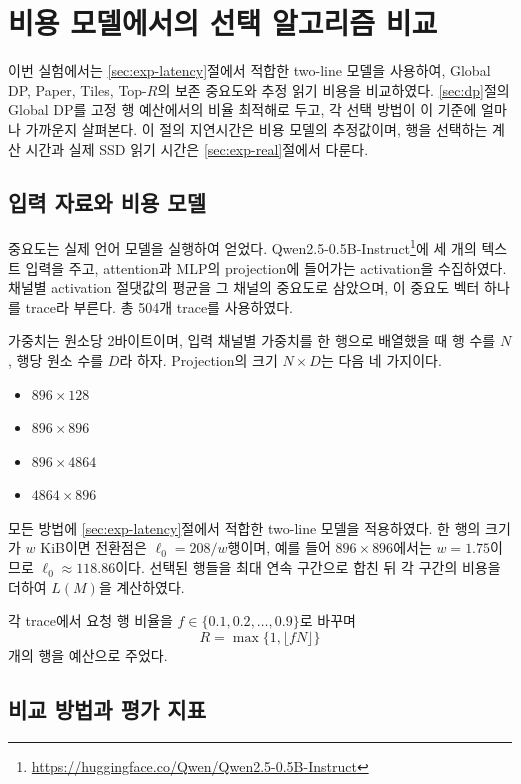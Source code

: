 \section{비용 모델에서의 선택 알고리즘 비교}\label{sec:exp-model}

이번 실험에서는 \ref{sec:exp-latency}절에서 적합한 two-line 모델을 사용하여, Global DP, Paper, Tiles, Top-$R$의 보존 중요도와 추정 읽기 비용을 비교하였다. \ref{sec:dp}절의 Global DP를 고정 행 예산에서의 비율 최적해로 두고, 각 선택 방법이 이 기준에 얼마나 가까운지 살펴본다. 이 절의 지연시간은 비용 모델의 추정값이며, 행을 선택하는 계산 시간과 실제 SSD 읽기 시간은 \ref{sec:exp-real}절에서 다룬다.

\subsection{입력 자료와 비용 모델}\label{sec:exp-model-input}

중요도는 실제 언어 모델을 실행하여 얻었다. Qwen2.5-0.5B-Instruct\footnote{\url{https://huggingface.co/Qwen/Qwen2.5-0.5B-Instruct}}에 세 개의 텍스트 입력을 주고, attention과 MLP의 projection에 들어가는 activation을 수집하였다. 채널별 activation 절댓값의 평균을 그 채널의 중요도로 삼았으며, 이 중요도 벡터 하나를 trace라 부른다. 총 504개 trace를 사용하였다.

가중치는 원소당 2바이트이며, 입력 채널별 가중치를 한 행으로 배열했을 때 행 수를 $N$, 행당 원소 수를 $D$라 하자. Projection의 크기 $N\times D$는 다음 네 가지이다.

\begin{itemize}
\item $896\times128$
\item $896\times896$
\item $896\times4864$
\item $4864\times896$
\end{itemize}

모든 방법에 \ref{sec:exp-latency}절에서 적합한 two-line 모델을 적용하였다. 한 행의 크기가 $w$ KiB이면 전환점은 $\ell_0=208/w$행이며, 예를 들어 $896\times896$에서는 $w=1.75$이므로 $\ell_0\approx118.86$이다. 선택된 행들을 최대 연속 구간으로 합친 뒤 각 구간의 비용을 더하여 $L(M)$을 계산하였다.

각 trace에서 요청 행 비율을 $f\in\{0.1,0.2,\ldots,0.9\}$로 바꾸며
\[
R=\max\{1,\lfloor fN\rfloor\}
\]
개의 행을 예산으로 주었다.

\subsection{비교 방법과 평가 지표}\label{sec:exp-model-methods}

